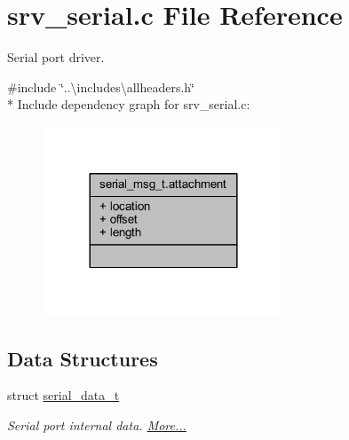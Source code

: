 \hypertarget{a00030}{\section{srv\+\_\+serial.\+c File Reference}
\label{a00030}
}


Serial port driver.  


{\ttfamily \#include \char`\"{}..\textbackslash{}includes\textbackslash{}allheaders.\+h\char`\"{}}\\*
Include dependency graph for srv\+\_\+serial.\+c\+:\nopagebreak
\begin{figure}[H]
\begin{center}
\leavevmode
\includegraphics[width=204pt]{da/d20/a01689}
\end{center}
\end{figure}
\subsection*{Data Structures}
\begin{DoxyCompactItemize}
\item 
struct \hyperlink{a00030_d8/db4/a00760}{serial\+\_\+data\+\_\+t}
\begin{DoxyCompactList}\small\item\em Serial port internal data.  \hyperlink{a00030_d8/db4/a00760}{More...}\end{DoxyCompactList}\end{DoxyCompactItemize}
